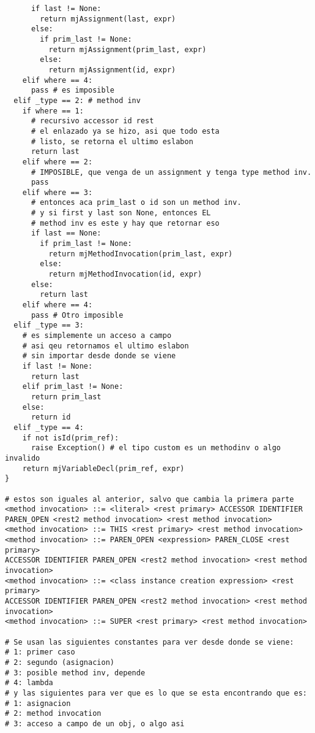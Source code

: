 \documentclass [a4paper,abstracton,titlepage]{scrartcl}
\begin{document}
\begin{lstlisting}
      if last != None:
        return mjAssignment(last, expr)
      else:
        if prim_last != None:
          return mjAssignment(prim_last, expr)
        else:
          return mjAssignment(id, expr)
    elif where == 4:
      pass # es imposible
  elif _type == 2: # method inv
    if where == 1:
      # recursivo accessor id rest
      # el enlazado ya se hizo, asi que todo esta 
      # listo, se retorna el ultimo eslabon
      return last
    elif where == 2:
      # IMPOSIBLE, que venga de un assignment y tenga type method inv.
      pass
    elif where == 3:
      # entonces aca prim_last o id son un method inv.
      # y si first y last son None, entonces EL 
      # method inv es este y hay que retornar eso
      if last == None:
        if prim_last != None:
          return mjMethodInvocation(prim_last, expr)
        else:
          return mjMethodInvocation(id, expr)
      else:
        return last
    elif where == 4:
      pass # Otro imposible
  elif _type == 3:
    # es simplemente un acceso a campo
    # asi qeu retornamos el ultimo eslabon
    # sin importar desde donde se viene
    if last != None:
      return last
    elif prim_last != None:
      return prim_last
    else:
      return id
  elif _type == 4:
    if not isId(prim_ref):
      raise Exception() # el tipo custom es un methodinv o algo invalido
    return mjVariableDecl(prim_ref, expr)
}

# estos son iguales al anterior, salvo que cambia la primera parte
<method invocation> ::= <literal> <rest primary> ACCESSOR IDENTIFIER
PAREN_OPEN <rest2 method invocation> <rest method invocation>
<method invocation> ::= THIS <rest primary> <rest method invocation>
<method invocation> ::= PAREN_OPEN <expression> PAREN_CLOSE <rest primary>
ACCESSOR IDENTIFIER PAREN_OPEN <rest2 method invocation> <rest method
invocation>
<method invocation> ::= <class instance creation expression> <rest primary>
ACCESSOR IDENTIFIER PAREN_OPEN <rest2 method invocation> <rest method
invocation>
<method invocation> ::= SUPER <rest primary> <rest method invocation>

# Se usan las siguientes constantes para ver desde donde se viene:
# 1: primer caso
# 2: segundo (asignacion)
# 3: posible method inv, depende
# 4: lambda
# y las siguientes para ver que es lo que se esta encontrando que es:
# 1: asignacion
# 2: method invocation
# 3: acceso a campo de un obj, o algo asi


\end{lstlisting}
\end{document}
